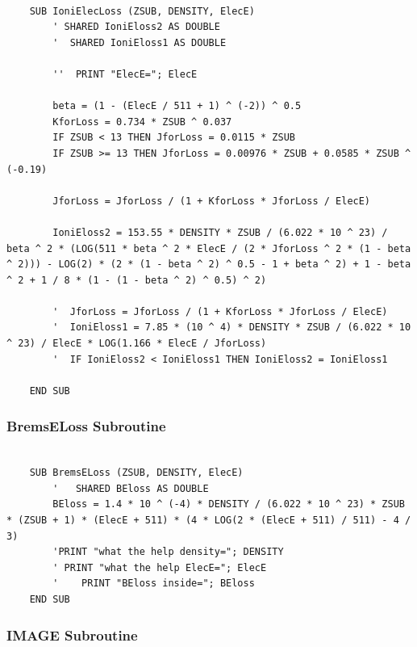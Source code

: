 \documentclass[10pt, reqno]{exam}
\begin{document}
\begin{verbatim}
    
    SUB IoniElecLoss (ZSUB, DENSITY, ElecE)
        ' SHARED IoniEloss2 AS DOUBLE
        '  SHARED IoniEloss1 AS DOUBLE
    
        ''  PRINT "ElecE="; ElecE
    
        beta = (1 - (ElecE / 511 + 1) ^ (-2)) ^ 0.5
        KforLoss = 0.734 * ZSUB ^ 0.037
        IF ZSUB < 13 THEN JforLoss = 0.0115 * ZSUB
        IF ZSUB >= 13 THEN JforLoss = 0.00976 * ZSUB + 0.0585 * ZSUB ^ (-0.19)
    
        JforLoss = JforLoss / (1 + KforLoss * JforLoss / ElecE)
    
        IoniEloss2 = 153.55 * DENSITY * ZSUB / (6.022 * 10 ^ 23) / beta ^ 2 * (LOG(511 * beta ^ 2 * ElecE / (2 * JforLoss ^ 2 * (1 - beta ^ 2))) - LOG(2) * (2 * (1 - beta ^ 2) ^ 0.5 - 1 + beta ^ 2) + 1 - beta ^ 2 + 1 / 8 * (1 - (1 - beta ^ 2) ^ 0.5) ^ 2)
    
        '  JforLoss = JforLoss / (1 + KforLoss * JforLoss / ElecE)
        '  IoniEloss1 = 7.85 * (10 ^ 4) * DENSITY * ZSUB / (6.022 * 10 ^ 23) / ElecE * LOG(1.166 * ElecE / JforLoss)
        '  IF IoniEloss2 < IoniEloss1 THEN IoniEloss2 = IoniEloss1
    
    END SUB
\end{verbatim}

\subsubsection{BremsELoss Subroutine}

\begin{verbatim}
    
    SUB BremsELoss (ZSUB, DENSITY, ElecE)
        '   SHARED BEloss AS DOUBLE
        BEloss = 1.4 * 10 ^ (-4) * DENSITY / (6.022 * 10 ^ 23) * ZSUB * (ZSUB + 1) * (ElecE + 511) * (4 * LOG(2 * (ElecE + 511) / 511) - 4 / 3)
        'PRINT "what the help density="; DENSITY
        ' PRINT "what the help ElecE="; ElecE
        '    PRINT "BEloss inside="; BEloss
    END SUB
\end{verbatim}

\subsubsection{IMAGE Subroutine}
\end{document}
